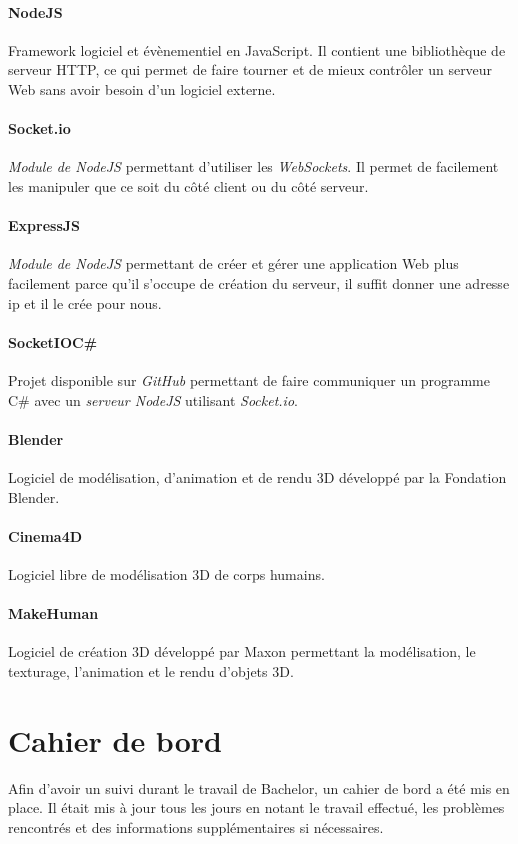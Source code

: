\subsubsection*{NodeJS}
\textsf{Framework} logiciel et évènementiel en \textsf{JavaScript}. Il contient une bibliothèque de serveur HTTP, ce qui permet de faire tourner et de mieux contrôler un serveur Web sans avoir besoin d'un logiciel externe.

\subsubsection*{Socket.io}
\textit{Module de NodeJS} permettant d'utiliser les \textit{WebSockets}. Il permet de facilement les manipuler que ce soit du côté client ou du côté serveur.

\subsubsection*{ExpressJS}
\textit{Module de NodeJS} permettant de créer et gérer une application Web plus facilement parce qu'il s'occupe de création du serveur, il suffit donner une adresse ip et il le crée pour nous.

\subsubsection*{SocketIOC\#}
Projet disponible sur \textit{GitHub} permettant de faire communiquer un programme C\# avec un \textit{serveur NodeJS} utilisant \textit{Socket.io}.

\subsubsection*{Blender}
Logiciel de modélisation, d'animation et de rendu 3D développé par la \textsf{Fondation Blender}.

\subsubsection*{Cinema4D}
Logiciel libre de modélisation 3D de corps humains.

\subsubsection*{MakeHuman}
Logiciel de création 3D développé par \textsf{Maxon} permettant la modélisation, le texturage, l'animation et le rendu d'objets 3D.

\chapter{Cahier de bord}
Afin d'avoir un suivi durant le travail de Bachelor, un cahier de bord a été mis en place. Il était mis à jour tous les jours en notant le travail effectué, les problèmes rencontrés et des informations supplémentaires si nécessaires.


